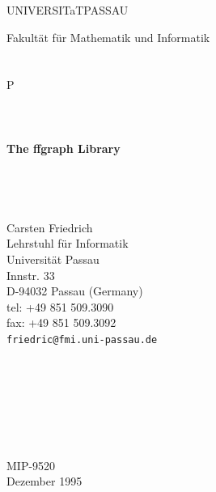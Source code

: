 \documentclass[a4paper]{article}
\begin{document}



\thispagestyle{empty}
\begin{center}
{\skriptuni UNIVERSITaTPASSAU} \\
\medskip

{\large {\sf Fakult\"at f\"ur Mathematik und Informatik}} \\
\ \\
\ \\
{\fmilogofont P}
\ \\
\ \\
\ \\
\ \\
{\Large {\bf The ffgraph Library}}\\
\ \\
\ \\              
\ \\
\ \\


Carsten Friedrich\\[4mm]
Lehrstuhl f\"{u}r Informatik \\
Universit\"at Passau\\
Innstr. 33\\
D-94032 Passau (Germany)\\
tel: +49 851 509.3090 \\
fax: +49 851 509.3092 \\
{\tt friedric@fmi.uni-passau.de}\\
\ \\
\ \\
\ \\
\ \\
\ \\
\ \\
\ \\
MIP-9520 \\
Dezember 1995 \\
\end{center}
\ \\
\ \\
\ \\
\ \\
\ \\ 
\ \\ 
\end{document}
